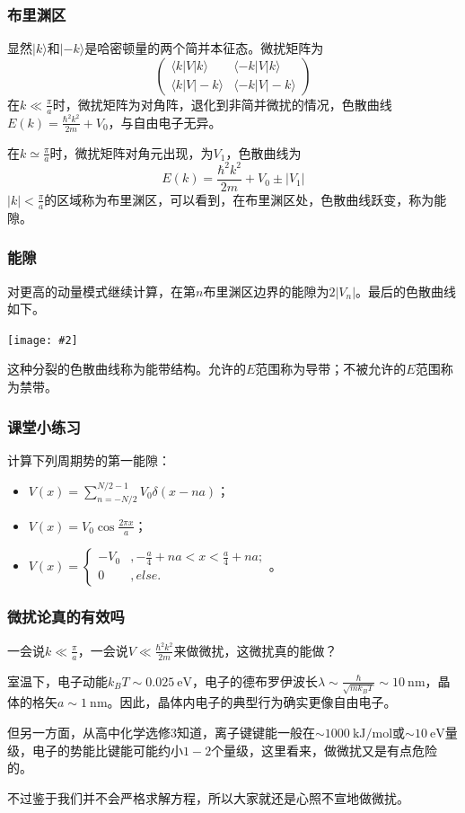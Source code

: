 \documentclass[CJK]{beamer}
\newcommand{\unit}[1]{\mathrm{\ #1}}
\newcommand{\cpic}[2]{
\begin{center}
\texttt{[image: \#2]}
\end{center}
}
\begin{document}
\begin{frame}
\frametitle{\bch 布里渊区 \ech}
\bch
显然$|k\rangle$和$|-k \rangle$是哈密顿量的两个简并本征态。微扰矩阵为
$$
\begin{pmatrix}
\langle k | V | k \rangle & \langle -k | V | k \rangle \\
\langle k | V | -k \rangle & \langle -k | V | -k \rangle
\end{pmatrix}
$$
在$k \ll \frac{\pi}{a}$时，微扰矩阵为对角阵，退化到非简并微扰的情况，色散曲线$E(k) = \frac{\hbar^2 k^2}{2m} + V_0$，与自由电子无异。
\par
在$k \simeq \frac{\pi}{a}$时，微扰矩阵对角元出现，为$V_1$，色散曲线为
$$
E(k) = \frac{\hbar^2 k^2}{2m} + V_0 \pm |V_1|
$$
$|k| < \frac{\pi}{a}$的区域称为布里渊区，可以看到，在布里渊区处，色散曲线跃变，称为能隙。
\ech
\end{frame}

\begin{frame}
\frametitle{\bch 能隙 \ech}
\bch
对更高的动量模式继续计算，在第$n$布里渊区边界的能隙为$2|V_n|$。最后的色散曲线如下。
\cpic{0.35}{energy_gap}
这种分裂的色散曲线称为能带结构。允许的$E$范围称为导带；不被允许的$E$范围称为禁带。
\ech
\end{frame}

\begin{frame}
\frametitle{\bch 课堂小练习 \ech}
\bch
计算下列周期势的第一能隙：
\begin{itemize}
\item $V(x) = \sum_{n=-N/2}^{N/2-1} V_0 \delta(x - na)$；
\item $V(x) = V_0 \cos \frac{2\pi x}{a}$；
\item $V(x) = \begin{cases} -V_0 &,-\frac{a}{4} + na < x < \frac{a}{4} + na; \\ 0 &,else. \end{cases}$。
\end{itemize}
\ech
\end{frame}

\begin{frame}
\frametitle{\bch 微扰论真的有效吗 \ech}
\bch
一会说$k \ll \frac{\pi}{a}$，一会说$V \ll \frac{\hbar^2 k^2}{2m}$来做微扰，这微扰真的能做？
\par
室温下，电子动能$k_B T \sim 0.025 \unit{eV}$，电子的德布罗伊波长$\lambda \sim \frac{\hbar} { \sqrt{m k_B T}} \sim 10 \unit{nm}$，晶体的格矢$a\sim 1\unit{nm}$。因此，晶体内电子的典型行为确实更像自由电子。
\par
但另一方面，从高中化学选修3知道，离子键键能一般在$\sim 1000 \unit{kJ/mol}$或$\sim 10 \unit{eV}$量级，电子的势能比键能可能约小$1-2$个量级，这里看来，做微扰又是有点危险的。
\par
不过鉴于我们并不会严格求解方程，所以大家就还是心照不宣地做微扰。
\ech
\end{frame}
\end{document}
